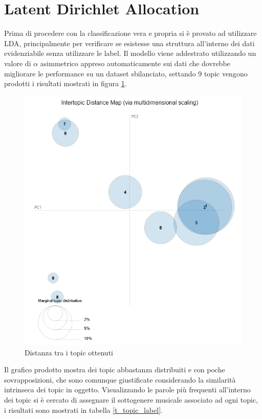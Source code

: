 \documentclass[technote]{IEEEtran}
\begin{document}
\section{Latent Dirichlet Allocation}
Prima di procedere con la classificazione vera e propria si è provato ad utilizzare LDA, principalmente per verificare se esistesse una struttura all'interno dei dati evidenziabile senza utilizzare le label.
Il modello viene addestrato utilizzando un valore di $ \alpha $ asimmetrico appreso automaticamente sui dati che dovrebbe migliorare le performance su un dataset sbilanciato, settando 9 topic vengono prodotti i risultati mostrati in figura \ref{fig_topic_pca}.
\begin{figure}[H]
\centerline{\includegraphics[width=1\columnwidth, scale=0.3]{images/topic_pca}}
\caption{Distanza tra i topic ottenuti}
\label{fig_topic_pca}
\end{figure}
Il grafico prodotto mostra dei topic abbastanza distribuiti e con poche sovrapposizioni, che sono comunque giustificate considerando la similarità intrinseca dei topic in oggetto.
Visualizzando le parole più frequenti all'interno dei topic si è cercato di assegnare il sottogenere musicale associato ad ogni topic, i risultati sono mostrati in tabella \ref{t_topic_label}.
\end{document}
